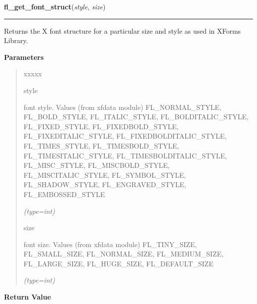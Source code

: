     \label{xformslib:flxbasic:fl_get_fontstruct}

    \vspace{0.5ex}

\hspace{.8\funcindent}\begin{boxedminipage}{\funcwidth}

    \raggedright \textbf{fl\_get\_font\_struct}(\textit{style}, \textit{size})

    \vspace{-1.5ex}

    \rule{\textwidth}{0.5\fboxrule}
\setlength{\parskip}{2ex}
    Returns the X font structure for a particular size and style as used in
    XForms Library.

\setlength{\parskip}{1ex}
      \textbf{Parameters}
      \vspace{-1ex}

      \begin{quote}
        \begin{Ventry}{xxxxx}

          \item[style]

          font style. Values (from xfdata module) FL\_NORMAL\_STYLE, 
          FL\_BOLD\_STYLE, FL\_ITALIC\_STYLE, FL\_BOLDITALIC\_STYLE, 
          FL\_FIXED\_STYLE, FL\_FIXEDBOLD\_STYLE, FL\_FIXEDITALIC\_STYLE, 
          FL\_FIXEDBOLDITALIC\_STYLE, FL\_TIMES\_STYLE, 
          FL\_TIMESBOLD\_STYLE, FL\_TIMESITALIC\_STYLE, 
          FL\_TIMESBOLDITALIC\_STYLE, FL\_MISC\_STYLE, FL\_MISCBOLD\_STYLE,
          FL\_MISCITALIC\_STYLE, FL\_SYMBOL\_STYLE, FL\_SHADOW\_STYLE, 
          FL\_ENGRAVED\_STYLE, FL\_EMBOSSED\_STYLE

            {\it (type=int)}

          \item[size]

          font size. Values (from xfdata module) FL\_TINY\_SIZE, 
          FL\_SMALL\_SIZE, FL\_NORMAL\_SIZE, FL\_MEDIUM\_SIZE, 
          FL\_LARGE\_SIZE, FL\_HUGE\_SIZE, FL\_DEFAULT\_SIZE

            {\it (type=int)}

        \end{Ventry}

      \end{quote}

      \textbf{Return Value}
    \vspace{-1ex}


\end{boxedminipage}
